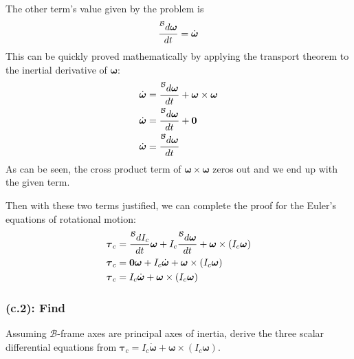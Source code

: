 \documentclass[titlepage]{article}
\begin{document}
\begin{mdframed}[linewidth=1pt, innertopmargin=10pt, innerbottommargin=10pt]
	The other term's value given by the problem is
	\begin{equation}
		\frac{\prescript{\mathcal{B}}{}{d \boldsymbol{\omega}}}{dt}=\dot{\boldsymbol{\omega}}
	\end{equation}
	This can be quickly proved mathematically by applying the transport theorem to the inertial derivative of $\boldsymbol{\omega}$:
	\begin{equation}
		\begin{split}
			\dot{\boldsymbol{\omega}}&=\frac{\prescript{\mathcal{B}}{}{d \boldsymbol{\omega}}}{dt}+\boldsymbol{\omega}\times\boldsymbol{\omega} \\
			\dot{\boldsymbol{\omega}}&=\frac{\prescript{\mathcal{B}}{}{d \boldsymbol{\omega}}}{dt}+\boldsymbol{0} \\
			\dot{\boldsymbol{\omega}}&=\frac{\prescript{\mathcal{B}}{}{d \boldsymbol{\omega}}}{dt} \\
		\end{split}
	\end{equation}
	As can be seen, the cross product term of $\boldsymbol{\omega}\times\boldsymbol{\omega}$ zeros out and we end up with the given term.
\end{mdframed}
\begin{mdframed}[linewidth=1pt, innertopmargin=10pt, innerbottommargin=10pt]
	Then with these two terms justified, we can complete the proof for the Euler's equations of rotational motion:
	\begin{equation}
		\begin{split}
			\boldsymbol{\tau}_c&=\frac{\prescript{\mathcal{B}}{}{d I_c}}{dt}\boldsymbol{\omega}+I_c\frac{\prescript{\mathcal{B}}{}{d \boldsymbol{\omega}}}{dt}+\boldsymbol{\omega}\times\left(I_c\boldsymbol{\omega}\right) \\
			\boldsymbol{\tau}_c&=\boldsymbol{0}\boldsymbol{\omega}+I_c\dot{\boldsymbol{\omega}}+\boldsymbol{\omega}\times\left(I_c\boldsymbol{\omega}\right) \\
			\boldsymbol{\tau}_c&=I_c\dot{\boldsymbol{\omega}}+\boldsymbol{\omega}\times\left(I_c\boldsymbol{\omega}\right) \\
		\end{split}
	\end{equation}
\end{mdframed}

\subsubsection*{(c.2): Find}
Assuming $\mathcal{B}$-frame axes are principal axes of inertia, derive the three scalar differential equations from $\boldsymbol{\tau}_c=I_c\dot{\boldsymbol{\omega}}+\boldsymbol{\omega}\times\left(I_c\boldsymbol{\omega}\right)$.\\
\end{document}
